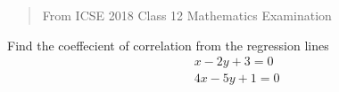 \documentclass[journal,12pt,twocolumn]{IEEEtran}
\begin{document}
% 

\maketitle
\newpage
\bigskip
\begin{abstract}
  From ICSE 2018 Class 12 Mathematics Examination
\end{abstract}

%



\begin{problem}[19.b]
             Find the coeffecient of correlation from the regression lines \begin{align}
               &x - 2y + 3 = 0
               \label{eq:Line1}
               \\
               &4x - 5y + 1 = 0
               \label{eq:Line2}
             \end{align}
\end{problem}
\end{document}

